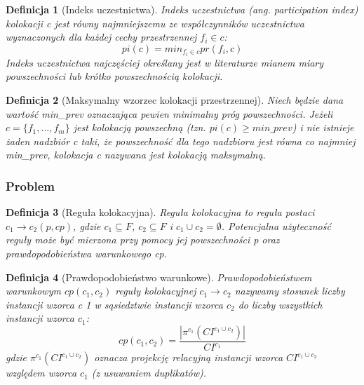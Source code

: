 \documentclass[12pt]{article}
\newtheorem{defin}{Definicja}
\begin{document}
\begin{defin}[Indeks uczestnictwa]Indeks uczestnictwa (ang. participation index) kolokacji c jest równy najmniejszemu ze współczynników uczestnictwa wyznaczonych dla każdej cechy przestrzennej $ f_{i} \in c$:
\begin{equation}
pi(c) = min_{f_{i} \in c} pr(f_{i} ,c)
\end{equation}
Indeks uczestnictwa najczęściej określany jest w literaturze mianem miary powszechności lub krótko powszechnością kolokacji.
\end{defin}

\begin{defin}[Maksymalny wzorzec kolokacji przestrzennej]Niech będzie dana wartość min\_prev oznaczająca pewien minimalny próg powszechności. Jeżeli $ c = \{f_{1},...,f_{m} \} $ jest kolokacją powszechną (tzn. $ pi(c) \ge min\_prev $) i nie istnieje żaden nadzbiór c taki, że powszechność dla tego nadzbioru jest równa co najmniej min\_prev, kolokacja c nazywana jest kolokacją maksymalną.  
\end{defin}

\subsubsection{Problem}

\begin{defin}[Reguła kolokacyjna]Reguła kolokacyjna to reguła postaci $ c_{1} \rightarrow c_{2}(p, cp)$, gdzie $ c_{1} \subseteq F $, $c_{2} \subseteq F $ i $c _{1} \cup c_{2} = \emptyset $. Potencjalna użyteczność reguły może być mierzona przy pomocy jej powszechności p oraz prawdopodobieństwa warunkowego cp.
\end{defin}

\begin{defin}[Prawdopodobieństwo warunkowe]Prawdopodobieństwem warunkowym
$ cp(c_{1}, c_{2})$ reguły kolokacyjnej $ c_{1} \rightarrow c_{2} $ nazywamy stosunek liczby instancji wzorca c 1 w sąsiedztwie instancji wzorca $ c_{2}$ do liczby wszystkich instancji wzorca $ c_{1} $:
\begin{equation}
cp(c_{1}, c_{2}) = \frac{|\pi^{c_{1}}(CI^{c_{1} \cup c_{2}})|}{CI^{c_{1}}}
\end{equation}
gdzie $\pi^{c_{1}}(CI^{c_{1} \cup c_{2}})$ oznacza projekcję relacyjną instancji wzorca $CI^{c_{1} \cup c_{2}}$ względem wzorca $ c_{1} $ (z usuwaniem duplikatów).
\end{defin}
\end{document}
